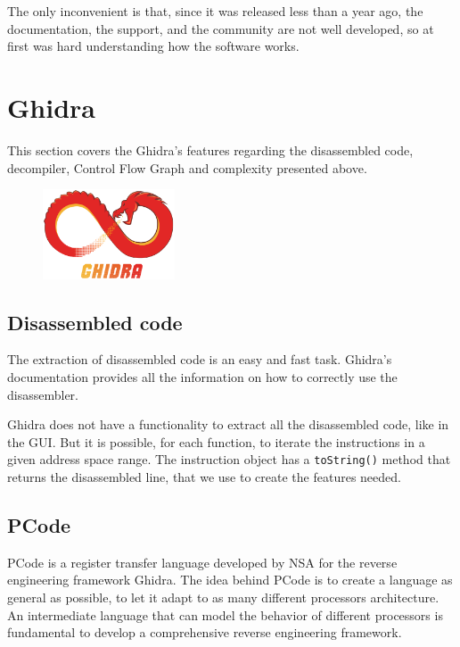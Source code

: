 The only inconvenient is that, since it was released less than a year ago, the documentation, the support, and the community are not well developed, so at first was hard understanding how the software works.
\section{Ghidra}

This section covers the Ghidra's features regarding the disassembled code, decompiler, Control Flow Graph and complexity presented above.
 
\begin{figure}[ht!]
	\centering
	\includegraphics[width=0.35\textwidth]{ghidra}
	
\end{figure}

\subsection{Disassembled code}

The extraction of disassembled code is an easy and fast task. Ghidra's documentation provides all the information on how to correctly use the disassembler. 

Ghidra does not have a functionality to extract all the disassembled code, like in the GUI. But it is possible, for each function, to iterate the instructions in a given address space range. The instruction object has a \texttt{toString()} method that returns the disassembled line, that we use to create the features needed.

\subsection{PCode}
PCode is a register transfer language developed by NSA for the reverse engineering framework Ghidra. The idea behind PCode is to create a language as general as possible, to let it adapt to as many different processors architecture. An intermediate language that can model the behavior of different processors is fundamental to develop a comprehensive reverse engineering framework.

